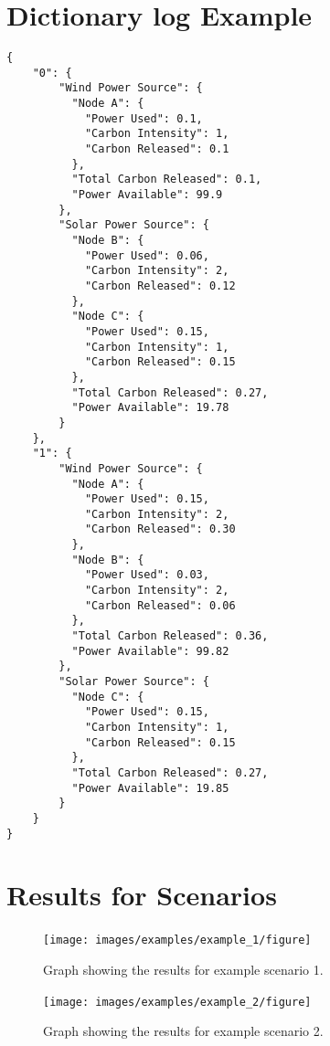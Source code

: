 \documentclass{l4proj}
\begin{document}
\section{Dictionary log Example}
\begin{lstlisting}[caption={Example dictionary structure used by the power domain.},label={lst:dic-log}]
{
    "0": {
        "Wind Power Source": {
          "Node A": {
            "Power Used": 0.1,
            "Carbon Intensity": 1,
            "Carbon Released": 0.1
          },
          "Total Carbon Released": 0.1,
          "Power Available": 99.9
        },
        "Solar Power Source": {
          "Node B": {
            "Power Used": 0.06,
            "Carbon Intensity": 2,
            "Carbon Released": 0.12
          },
          "Node C": {
            "Power Used": 0.15,
            "Carbon Intensity": 1,
            "Carbon Released": 0.15
          },
          "Total Carbon Released": 0.27,
          "Power Available": 19.78
        }
    },
    "1": {
        "Wind Power Source": {
          "Node A": {
            "Power Used": 0.15,
            "Carbon Intensity": 2,
            "Carbon Released": 0.30
          },
          "Node B": {
            "Power Used": 0.03,
            "Carbon Intensity": 2,
            "Carbon Released": 0.06
          },
          "Total Carbon Released": 0.36,
          "Power Available": 99.82
        },
        "Solar Power Source": {
          "Node C": {
            "Power Used": 0.15,
            "Carbon Intensity": 1,
            "Carbon Released": 0.15
          },
          "Total Carbon Released": 0.27,
          "Power Available": 19.85
        }
    }
}
\end{lstlisting}

\clearpage
\section{Results for Scenarios}\label{apen:subsec:scen1}
\begin{figure}[htbp]
    \centering
    \texttt{[image: images/examples/example\_1/figure]}
    ~
    \caption{Graph showing the results for example scenario 1.}
    \label{fig:example1}
\end{figure}

\clearpage
\begin{figure}[htbp]
    \centering
    \texttt{[image: images/examples/example\_2/figure]}
    ~
    \caption{Graph showing the results for example scenario 2.}
    \label{fig:example2}
\end{figure}
\end{document}
